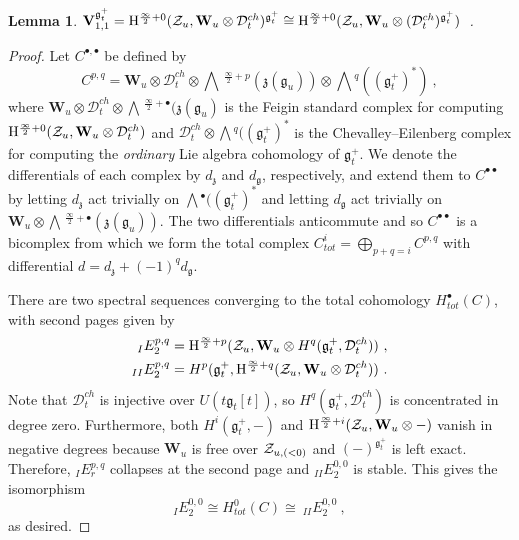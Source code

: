 \documentclass[a4paper]{article}
\newtheorem{lem}[thm]{Lemma}
\def\ZZ{{\cal Z}}
\def\gf{\mathfrak{g}}
\def \zf{\mathfrak{z}}
\newcommand{\Hi}[1]{\mathrm{H}^{\frac{\infty}{2}+#1}}
\newcommand{\Li}[1]{\mathrm{\bigwedge}\,^{\frac{\infty}{2}+#1}}
\def\D{\mathcal{D}^{ch}}
\def\W{\mathbf{W}}
\def\V{\mathbf{V}}
\begin{document}
\begin{lem}
$\V_{1,1}^{\gf_t^+}=\Hi{0}(\ZZ_u,\W_u\otimes \D_t)^{\gf_t^+} \cong \Hi{0}(\ZZ_u,\W_u\otimes (\D_t)^{\gf_t^+})$~.
\end{lem}
\begin{proof}
Let $C^{\bullet,\bullet}$ be defined by
\begin{equation*}
	C^{p,q} = \W_u\otimes \D_t \otimes \Li{p}(\zf(\gf_u))\otimes \bigwedge\! ^q ((\gf_t^+)^*)~,
\end{equation*}
where $\W_u\otimes \D_t \otimes \Li{\bullet}(\zf(\gf_u)$ is the Feigin standard complex for computing $\Hi{0}(\ZZ_u,\W_u\otimes \D_t)$ and $\D_t \otimes \bigwedge\! ^q((\gf_t^+)^*$ is the Chevalley--Eilenberg complex for computing the \textit{ordinary} Lie algebra cohomology of $\gf_t^+$. We denote the differentials of each complex by $d_{\zf}$ and $d_{\gf}$, respectively, and extend them to $C^{\bullet\bullet}$ by letting $d_{\zf}$ act trivially on $ \bigwedge\! ^\bullet((\gf_t^+)^*$ and letting $d_{\gf}$ act trivially on $\W_u\otimes \Li{\bullet}(\zf(\gf_u))$. The two differentials anticommute and so $C^{\bullet\bullet}$ is a bicomplex from which we form the total complex $C^i_{tot} = \bigoplus_{p+q=i} C^{p,q}$ with differential $d = d_{\zf}+ (-1)^q d_{\gf}$.

There are two spectral sequences converging to the total cohomology $H_{tot}^\bullet(C)$, with second pages given by
\begin{equation}\nonumber
	\begin{split}
	 _I E_{2}^{p,q} &= \Hi{p}(\ZZ_u,\W_u\otimes H^q(\gf_t^+,\D_t))~,\\
	 _{II} E_{2}^{p,q} &= H^p(\gf_t^+, \Hi{q}(\ZZ_u,\W_u\otimes \D_t))~.
	\end{split}
\end{equation}
Note that $\D_t$ is injective over $U(t\gf_t[t])$, so $H^q(\gf_t^+,\D_t)$ is concentrated in degree zero. Furthermore, both $H^i(\gf_t^+,-)$ and $\Hi{i}(\ZZ_u,\W_u\otimes-)$ vanish in negative degrees because $\W_u$ is free over $\ZZ_{u,(<0)}$ and $(-)^{\gf_t^+}$ is left exact. Therefore, $_I E_{r}^{p,q}$ collapses at the second page and $_{II} E_{2}^{0,0}$ is stable. This gives the isomorphism
\begin{equation*}
	_I E_2^{0,0} \cong H^0_{tot}(C) \cong\ _{II}E_2^{0,0}~,
\end{equation*}
as desired.
\end{proof}
\vspace{-6pt}
\end{document}
